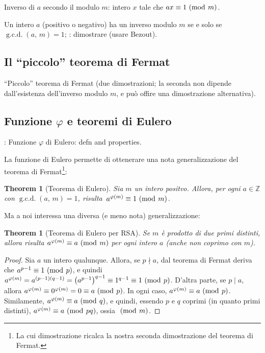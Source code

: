 \documentclass[pdflatex,11pt,a4paper,oneside]{article}
\renewcommand{\phi}{\varphi}
\newcommand{\XXX}[1][XXX]{\text{\bfseries{\color{red}{\emph{#1}}}}}
\newcommand{\TODO}[0]{\XXX[TODO]}
\newcommand{\p}[1]{\left({#1}\right)}
\newcommand{\Z}[0]{\mathbb{Z}}
\newcommand{\divides}[0]{\mid}
\newcommand{\notdivides}[0]{\nmid}
\newcommand{\congruent}[0]{\equiv}
\newcommand{\mmodop}[0]{\ensuremath{\operatorname{mod}}}
\newcommand{\mmod}[1]{\ensuremath{\allowbreak\ (\mmodop\:{#1})}}
\newcommand{\gcdop}[0]{\ensuremath{\operatorname{g.c.d.}}}
\newcommand{\xgcd}[1]{\ensuremath{\gcdop\left({#1}\right)}}
\renewcommand{\gcd}[2]{\xgcd{{#1},\,{#2}}}
\newtheorem{theorem}[TheoremLike]{Theorem}
\begin{document}
Inverso di $a$ secondo il modulo $m$: intero $x$ tale che
$ax \congruent 1 \mmod m$.

Un intero $a$ (positivo o negativo) ha un inverso modulo $m$ se e solo se
$\gcd{a}{m} = 1$; \TODO: dimostrare (usare Bezout).


\subsection{Il ``piccolo'' teorema di Fermat}

``Piccolo'' teorema di Fermat (due dimostrazioni; la seconda non dipende
dall'esistenza dell'inverso modulo $m$, e pu\`o offire una dimostrazione
alternativa).


\subsection{Funzione $\phi$ e teoremi di Eulero}

\TODO: Funzione $\phi$ di Eulero: defn and properties.

La funzione di Eulero permette di ottenerare una nota generalizzazione
del teorema di Fermat\footnote{La cui dimostrazione ricalca la nostra
seconda dimostrazione del teorema di Fermat.}:

\begin{theorem}[Teorema di Eulero]\label{thm:euler}
  Sia $m$ un intero positvo. Allora, per ogni $a \in \Z$ con
  $\gcd{a}{m} = 1$, risulta\, $a^{\phi(m)} \congruent 1 \mmod m$.
\end{theorem}

\noindent
Ma a noi interessa una diversa (e meno nota) generalizzazione:

\begin{theorem}[Teorema di Eulero per RSA]\label{thm:euler-rsa}
Se $m$ \`e prodotto di due primi \emph{distinti}, allora risulta
$a^{\phi(m)} \congruent a \mmod m$ per \emph{ogni} intero $a$ (anche
non coprimo con $m$).
\end{theorem}
%
\begin{proof}
Sia $a$ un intero qualunque.  Allora, se $p \notdivides a$, dal teorema
di Fermat deriva che $a^{p-1} \congruent 1 \mmod p$, e quindi
$a^{\phi(m)} = a^{(p-1)(q-1)} = {\p{a^{p-1}}}^{q-1} \congruent 1^{q-1}
\congruent 1 \mmod p$.  D'altra parte, se $p \divides a$, allora
$a^{\phi(m)} \congruent 0^{\phi(m)} = 0 \congruent a \mmod p$.  In ogni
caso, $a^{\phi(m)} \congruent a \mmod p$.  Similamente, $a^{\phi(m)}
\congruent a \mmod q$, e quindi, essendo $p$ e $q$ coprimi (in quanto
primi distinti), $a^{\phi(m)} \congruent a \mmod{pq}$, ossia $\mmod m$.
\end{proof}
\end{document}

